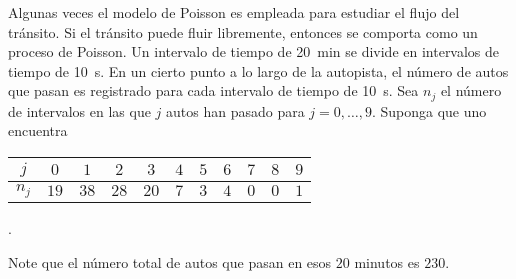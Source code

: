 \question
	Algunas veces el modelo de Poisson es empleada para estudiar el flujo del tránsito. Si el tránsito puede fluir libremente, entonces se comporta como un proceso de Poisson. Un intervalo de tiempo de \SI{20}{\minute} se divide en intervalos de tiempo de \SI{10}{\second}. En un cierto punto a lo largo de la autopista, el número de autos que pasan es registrado para cada intervalo de tiempo de \SI{10}{\second}. Sea $n_j$ el número de intervalos en las que $j$ autos han pasado para $j=0,\ldots,9$. Suponga que uno encuentra

	\centering
	\begin{tabular}{c|cccccccccc}
		$j$ 	& $0$ & $1$ & $2$ & $3$ & $4$ & $5$ & $6$ & $7$ & $8$ & $9$ \\
		\hline
		$n_{j}	$& $19$ & $38$ & $28$ & $20$ & $7$ & $3$ & $4$ & $0$ & $0$ & $1$
	\end{tabular}\quad.

	\justifying
	\noindent
	Note que el número total de autos que pasan en esos $20$ minutos es $230$.


